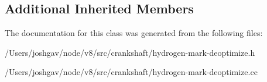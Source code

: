 \subsection*{Additional Inherited Members}


The documentation for this class was generated from the following files\+:\begin{DoxyCompactItemize}
\item 
/\+Users/joshgav/node/v8/src/crankshaft/hydrogen-\/mark-\/deoptimize.\+h\item 
/\+Users/joshgav/node/v8/src/crankshaft/hydrogen-\/mark-\/deoptimize.\+cc\end{DoxyCompactItemize}
